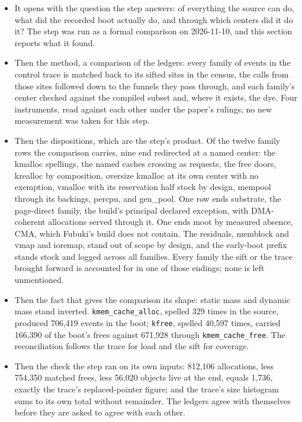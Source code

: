 \documentclass[11pt]{article}
\begin{document}
\begin{itemize}
\item It opens with the question the step answers: of everything the source can do, what did the recorded boot actually do, and through which centers did it do it? The step was run as a formal comparison on 2026-11-10, and this section reports what it found.
\item Then the method, a comparison of the ledgers: every family of events in the control trace is matched back to its sifted sites in the census, the calls from those sites followed down to the funnels they pass through, and each family's center checked against the compiled subset and, where it exists, the dye. Four instruments, read against each other under the paper's rulings; no new measurement was taken for this step.
\item Then the dispositions, which are the step's product. Of the twelve family rows the comparison carries, nine end redirected at a named center: the kmalloc spellings, the named caches crossing as requests, the free doors, krealloc by composition, oversize kmalloc at its own center with no exemption, vmalloc with its reservation half stock by design, mempool through its backings, percpu, and gen\_pool. One row ends substrate, the page-direct family, the build's principal declared exception, with DMA-coherent allocations served through it. One ends moot by measured absence, CMA, which Fubuki's build does not contain. The residuals, memblock and vmap and ioremap, stand out of scope by design, and the early-boot prefix stands stock and logged across all families. Every family the sift or the trace brought forward is accounted for in one of those endings; none is left unmentioned.
\item Then the fact that gives the comparison its shape: static mass and dynamic mass stand inverted. \texttt{kmem\_cache\_alloc}, spelled 329 times in the source, produced 706,419 events in the boot; \texttt{kfree}, spelled 40,597 times, carried 166,390 of the boot's frees against 671,928 through \texttt{kmem\_cache\_free}. The reconciliation follows the trace for load and the sift for coverage.
\item Then the check the step ran on its own inputs: 812,106 allocations, less 754,350 matched frees, less 56,020 objects live at the end, equals 1,736, exactly the trace's replaced-pointer figure; and the trace's size histogram sums to its own total without remainder. The ledgers agree with themselves before they are asked to agree with each other.

\end{itemize}
\end{document}
